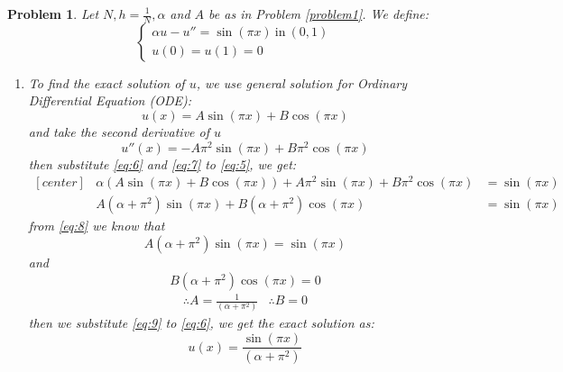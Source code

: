 \documentclass[a4paper,12pt]{article}
\newtheorem{prob}{Problem}[]
\begin{document}
\begin{prob}
	Let $N,h=\frac{1}{N}, \alpha$ and $A$ be as in Problem \ref{problem1}. We define:
	\begin{equation}\label{eq:5}
	\begin{cases}
	\alpha u - u'' = \sin(\pi x)\ \text{in}\ (0,1)\\
	u(0) = u(1) = 0
	\end{cases}
	\end{equation}
	
	\begin{enumerate}[label=(\alph*)]
		\item To find the exact solution of $u$, we use general solution for Ordinary Differential Equation (ODE):
		\begin{equation}\label{eq:6}
		u(x) = A \sin(\pi x) + B \cos(\pi x)
		\end{equation}
		and take the second derivative of $u$
		\begin{equation}\label{eq:7}
		u''(x) = -A\pi^2 \sin(\pi x) + B\pi^2 \cos(\pi x)
		\end{equation}
		then substitute \eqref{eq:6} and \eqref{eq:7} to \eqref{eq:5}, we get:
		\begin{equation}\label{eq:8}
		\begin{aligned}[center]
		&\alpha(A \sin (\pi x) + B \cos (\pi x)) + A\pi^2 \sin(\pi x) + B\pi^2 \cos(\pi x) &= \sin (\pi x)\\
		&A(\alpha + \pi^2) \sin (\pi x) + B(\alpha + \pi^2) \cos (\pi x) &= \sin (\pi x)
		\end{aligned}
		\end{equation}
		from \eqref{eq:8} we know that $$A(\alpha + \pi^2) \sin (\pi x) = \sin (\pi x)$$ and $$B(\alpha + \pi^2) \cos (\pi x) = 0$$
		\begin{eqnarray}\label{eq:9}
		\therefore A = \frac{1}{(\alpha + \pi^2)} & \therefore B = 0
		\end{eqnarray}
		then we substitute \eqref{eq:9} to \eqref{eq:6}, we get the exact solution as:
		\begin{equation}
		u(x) = \frac{\sin(\pi x)}{(\alpha + \pi^2)}
		\end{equation}
		

\end{enumerate}
\end{prob}
\end{document}

